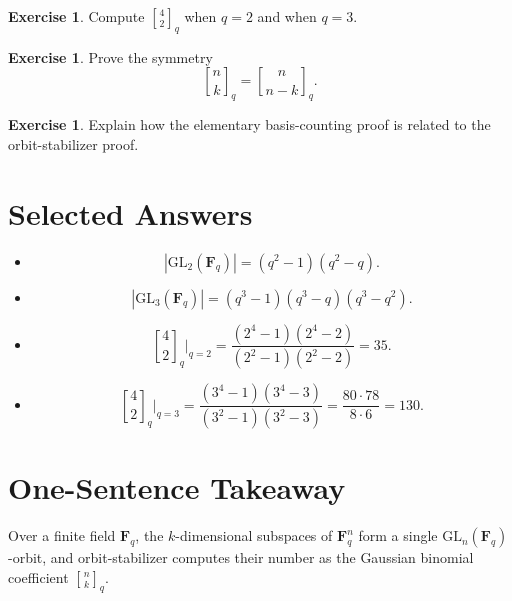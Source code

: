 \documentclass[11pt]{article}
\theoremstyle{definition}
\newtheorem{exercise}[theorem]{Exercise}
\theoremstyle{remark}
\newcommand{\F}{\mathbf{F}}
\newcommand{\GL}{\mathrm{GL}}
\newcommand{\qbinom}[2]{\genfrac{[}{]}{0pt}{}{#1}{#2}_q}
\begin{document}
	\begin{exercise}
		Compute \(\qbinom{4}{2}\) when \(q=2\) and when \(q=3\).
	\end{exercise}
	
	\begin{exercise}
		Prove the symmetry
		\[
		\qbinom{n}{k}=\qbinom{n}{n-k}.
		\]
	\end{exercise}
	
	\begin{exercise}
		Explain how the elementary basis-counting proof is related to the orbit-stabilizer proof.
	\end{exercise}
	
	\section{Selected Answers}
	
	\begin{itemize}
		\item
		\[
		|\GL_2(\F_q)|=(q^2-1)(q^2-q).
		\]
		
		\item
		\[
		|\GL_3(\F_q)|=(q^3-1)(q^3-q)(q^3-q^2).
		\]
		
		\item
		\[
		\qbinom{4}{2}\Big|_{q=2}
		=
		\frac{(2^4-1)(2^4-2)}{(2^2-1)(2^2-2)}
		=
		35.
		\]
		
		\item
		\[
		\qbinom{4}{2}\Big|_{q=3}
		=
		\frac{(3^4-1)(3^4-3)}{(3^2-1)(3^2-3)}
		=
		\frac{80\cdot 78}{8\cdot 6}
		=
		130.
		\]
	\end{itemize}
	
	\section*{One-Sentence Takeaway}
	
	Over a finite field \(\F_q\), the \(k\)-dimensional subspaces of \(\F_q^n\) form a single \(\GL_n(\F_q)\)-orbit, and orbit-stabilizer computes their number as the Gaussian binomial coefficient \(\qbinom{n}{k}\).
	
\end{document}

